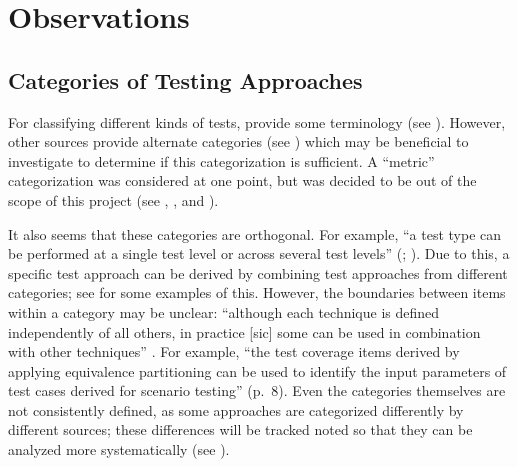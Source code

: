 \section{Observations}

\subsection{Categories of Testing Approaches}

For classifying different kinds of tests, \citet{IEEE2022} provide some
terminology (see ). However, other sources
\citep{BarbosaEtAl2006, SouzaEtAl2017} provide alternate
categories (see ) which may be beneficial to investigate to
determine if this categorization is sufficient. A ``metric'' categorization was
considered at one point, but was decided to be out of the scope of this project
(see , , and ).

It also seems that these categories are orthogonal. For example, ``a test type
can be performed at a single test level or across several test levels''
(\citealp[p.~15]{IEEE2022}; \citeyear[p.~7]{IEEE2021}). Due to this, a specific
test approach can be derived by combining test approaches from different
categories; see  for some examples
of this. However, the boundaries between items within a category may be unclear:
``although each technique is defined independently of all others, in practice
      [sic] some can be used in combination with other techniques''
\citep[p.~8]{IEEE2021}. For example, ``the test coverage items derived by
applying equivalence partitioning can be used to identify the input parameters
of test cases derived for scenario testing'' (p.~8). Even the categories
themselves are not consistently defined, as some approaches are categorized
differently by different sources; these differences will be tracked noted so
that they can be analyzed more systematically (see ).


